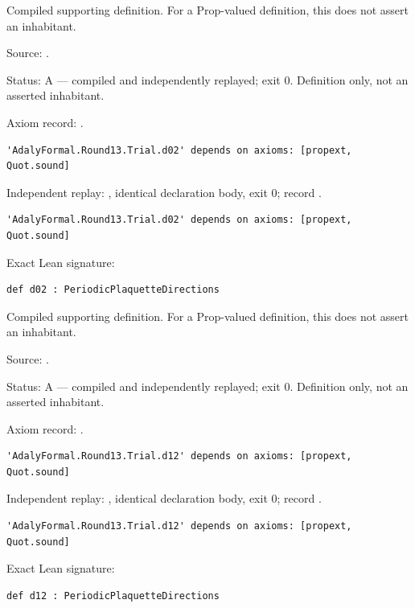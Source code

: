 \begin{definition}[bp-379]
\label{bp-379}
\uses{}
\leanok
Compiled supporting definition. For a Prop-valued definition, this does not assert an inhabitant.

\par Source: \texttt{}.
\par Status: A — compiled and independently replayed; exit 0. Definition only, not an asserted inhabitant.
\par Axiom record: \texttt{}.
\begin{verbatim}
'AdalyFormal.Round13.Trial.d02' depends on axioms: [propext, Quot.sound]
\end{verbatim}
\par Independent replay: \texttt{}, identical declaration body, exit 0; record \texttt{}.
\begin{verbatim}
'AdalyFormal.Round13.Trial.d02' depends on axioms: [propext, Quot.sound]
\end{verbatim}
\par Exact Lean signature:
\begin{verbatim}
def d02 : PeriodicPlaquetteDirections
\end{verbatim}
\end{definition}

\begin{definition}[bp-380]
\label{bp-380}
\uses{}
\leanok
Compiled supporting definition. For a Prop-valued definition, this does not assert an inhabitant.

\par Source: \texttt{}.
\par Status: A — compiled and independently replayed; exit 0. Definition only, not an asserted inhabitant.
\par Axiom record: \texttt{}.
\begin{verbatim}
'AdalyFormal.Round13.Trial.d12' depends on axioms: [propext, Quot.sound]
\end{verbatim}
\par Independent replay: \texttt{}, identical declaration body, exit 0; record \texttt{}.
\begin{verbatim}
'AdalyFormal.Round13.Trial.d12' depends on axioms: [propext, Quot.sound]
\end{verbatim}
\par Exact Lean signature:
\begin{verbatim}
def d12 : PeriodicPlaquetteDirections
\end{verbatim}
\end{definition}

